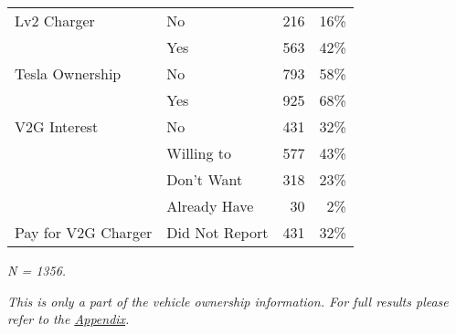 \begin{table}[H]
\begin{threeparttable}
\begin{tabular}[t]{llrr}
\multirow{-2}{*}{\raggedright\arraybackslash Lv2 Charger} & No & 216 & 16\%\\
\cmidrule(lr){1-4}
 & Yes & 563 & 42\%\\

\multirow{-2}{*}{\raggedright\arraybackslash Tesla Ownership} & No & 793 & 58\%\\
\cmidrule(lr){1-4}
 & Yes & 925 & 68\%\\

\multirow{-2}{*}{\raggedright\arraybackslash V2G Interest} & No & 431 & 32\%\\
\cmidrule(lr){1-4}
 & Willing to & 577 & 43\%\\

 & Don't Want & 318 & 23\%\\

 & Already Have & 30 & 2\%\\

\multirow{-4}{*}{\raggedright\arraybackslash Pay for V2G Charger} & Did Not Report & 431 & 32\%\\
\bottomrule
\end{tabular}
\begin{tablenotes}
\small
\item [1] \textit{N = 1356.}
\item [2] \textit{This is only a part of the vehicle ownership information. For full results please refer to the \hyperref[appendix]{Appendix}.}
\end{tablenotes}
\label{table_vehicles}
\end{threeparttable}
\end{table}